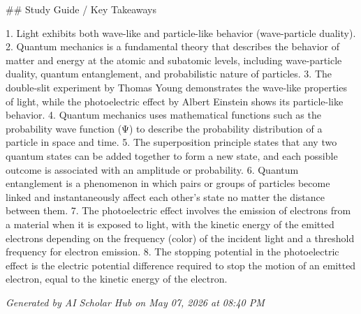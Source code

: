 \documentclass{article}
\begin{document}
## Study Guide / Key Takeaways

1. Light exhibits both wave-like and particle-like behavior (wave-particle duality).
2. Quantum mechanics is a fundamental theory that describes the behavior of matter and energy at the atomic and subatomic levels, including wave-particle duality, quantum entanglement, and probabilistic nature of particles.
3. The double-slit experiment by Thomas Young demonstrates the wave-like properties of light, while the photoelectric effect by Albert Einstein shows its particle-like behavior.
4. Quantum mechanics uses mathematical functions such as the probability wave function (Ψ) to describe the probability distribution of a particle in space and time.
5. The superposition principle states that any two quantum states can be added together to form a new state, and each possible outcome is associated with an amplitude or probability.
6. Quantum entanglement is a phenomenon in which pairs or groups of particles become linked and instantaneously affect each other's state no matter the distance between them.
7. The photoelectric effect involves the emission of electrons from a material when it is exposed to light, with the kinetic energy of the emitted electrons depending on the frequency (color) of the incident light and a threshold frequency for electron emission.
8. The stopping potential in the photoelectric effect is the electric potential difference required to stop the motion of an emitted electron, equal to the kinetic energy of the electron.

\vfill
\begin{center}
\footnotesize \textit{Generated by AI Scholar Hub on May 07, 2026 at 08:40 PM}
\end{center}
\end{document}
